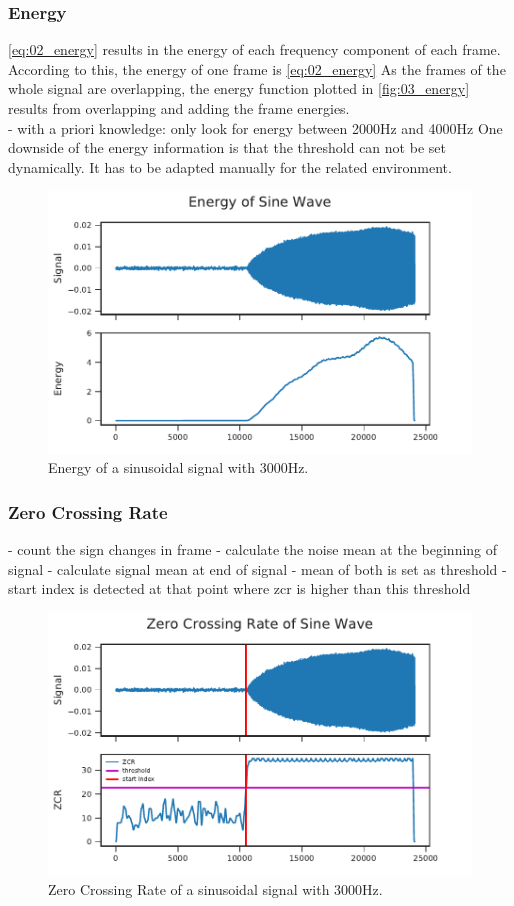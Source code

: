 \subsubsection*{Energy}

\ref{eq:02_energy} results in the energy of each frequency component of each frame.
According to this, the energy of one frame is \ref{eq:02_energy}
As the frames of the whole signal are overlapping, the energy function plotted in
\ref{fig:03_energy} results from overlapping and adding the frame energies.\\
- with a priori knowledge: only look for energy between 2000Hz and 4000Hz
One downside of the energy information is that the threshold can not be
set dynamically. It has to be adapted manually for the related environment.

\begin{figure}[ht]
	\centering
		\includegraphics[]{figures/sine_energy}
	\caption{Energy of a sinusoidal signal with 3000Hz.}
\end{figure}
\label{fig:03_energy}


\subsubsection*{Zero Crossing Rate}

- count the sign changes in frame
- calculate the noise mean at the beginning of signal
- calculate signal mean at end of signal
- mean of both is set as threshold
- start index is detected at that point where zcr is higher than this threshold

\begin{figure}[ht]
	\centering
		\includegraphics[]{figures/sine_zcr}
	\caption{Zero Crossing Rate of a sinusoidal signal with 3000Hz.}
\end{figure}
\label{fig:03_zcr}